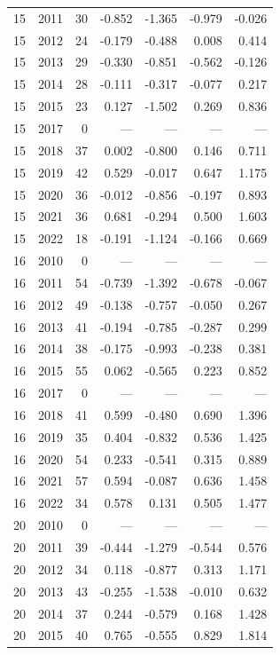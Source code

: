 \begin{longtable}{llrrrrr}
15 & 2011 & 30 & -0.852 & -1.365 & -0.979 & -0.026 \\
15 & 2012 & 24 & -0.179 & -0.488 & 0.008 & 0.414 \\
15 & 2013 & 29 & -0.330 & -0.851 & -0.562 & -0.126 \\
15 & 2014 & 28 & -0.111 & -0.317 & -0.077 & 0.217 \\
15 & 2015 & 23 & 0.127 & -1.502 & 0.269 & 0.836 \\
15 & 2017 & 0 & --- & --- & --- & --- \\
15 & 2018 & 37 & 0.002 & -0.800 & 0.146 & 0.711 \\
15 & 2019 & 42 & 0.529 & -0.017 & 0.647 & 1.175 \\
15 & 2020 & 36 & -0.012 & -0.856 & -0.197 & 0.893 \\
15 & 2021 & 36 & 0.681 & -0.294 & 0.500 & 1.603 \\
15 & 2022 & 18 & -0.191 & -1.124 & -0.166 & 0.669 \\
16 & 2010 & 0 & --- & --- & --- & --- \\
16 & 2011 & 54 & -0.739 & -1.392 & -0.678 & -0.067 \\
16 & 2012 & 49 & -0.138 & -0.757 & -0.050 & 0.267 \\
16 & 2013 & 41 & -0.194 & -0.785 & -0.287 & 0.299 \\
16 & 2014 & 38 & -0.175 & -0.993 & -0.238 & 0.381 \\
16 & 2015 & 55 & 0.062 & -0.565 & 0.223 & 0.852 \\
16 & 2017 & 0 & --- & --- & --- & --- \\
16 & 2018 & 41 & 0.599 & -0.480 & 0.690 & 1.396 \\
16 & 2019 & 35 & 0.404 & -0.832 & 0.536 & 1.425 \\
16 & 2020 & 54 & 0.233 & -0.541 & 0.315 & 0.889 \\
16 & 2021 & 57 & 0.594 & -0.087 & 0.636 & 1.458 \\
16 & 2022 & 34 & 0.578 & 0.131 & 0.505 & 1.477 \\
20 & 2010 & 0 & --- & --- & --- & --- \\
20 & 2011 & 39 & -0.444 & -1.279 & -0.544 & 0.576 \\
20 & 2012 & 34 & 0.118 & -0.877 & 0.313 & 1.171 \\
20 & 2013 & 43 & -0.255 & -1.538 & -0.010 & 0.632 \\
20 & 2014 & 37 & 0.244 & -0.579 & 0.168 & 1.428 \\
20 & 2015 & 40 & 0.765 & -0.555 & 0.829 & 1.814 \\

\end{longtable}
